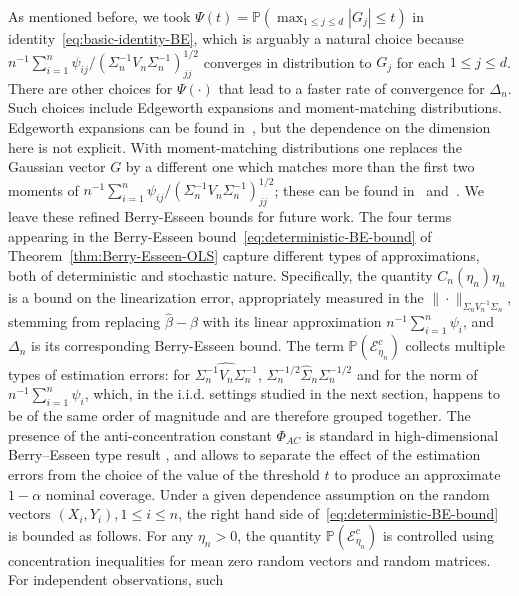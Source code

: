 \documentclass{article}
\begin{document}
As mentioned before, we took $\Psi(t) = \mathbb{P}(\max_{1\le j\le d}|G_j| \le t)$ in identity~\eqref{eq:basic-identity-BE}, which is arguably a natural choice because $n^{-1}\sum_{i=1}^n \psi_{ij}/(\Sigma_n^{-1}V_n\Sigma_n^{-1})_{jj}^{1/2}$ converges in distribution to $G_j$ for each $1\le j\le d$. There are other choices for $\Psi(\cdot)$ that lead to a faster rate of convergence for $\Delta_n$. Such choices include Edgeworth expansions and moment-matching distributions. Edgeworth expansions can be found in~\citet{bhattacharya2010normal}, but the dependence on the dimension here is not explicit. With moment-matching distributions one replaces the Gaussian vector $G$ by a different one which matches more than the first two moments of $n^{-1}\sum_{i=1}^n \psi_{ij}/(\Sigma_n^{-1}V_n\Sigma_n^{-1})_{jj}^{1/2}$; these can be found in~\cite{boutsikas2015penultimate} and~\cite{zhilova2016non}. We leave these refined Berry-Esseen bounds for future work.
The four terms appearing in the Berry-Esseen bound~\eqref{eq:deterministic-BE-bound} of Theorem~\ref{thm:Berry-Esseen-OLS} capture different types of approximations, both of deterministic and stochastic nature. Specifically, the quantity
$C_n(\eta_n)\eta_n$ is a bound on the linearization
error, appropriately measured in the $\| \cdot \|_{ \Sigma_n V^{-1}_n\Sigma_n }$, stemming from replacing $\widehat{\beta} - \beta$ with its
linear approximation $n^{-1}\sum_{i=1}^n \psi_i$, and
$\Delta_n$
is its corresponding Berry-Esseen bound. The term $\mathbb{P}(\mathcal{E}_{\eta_n}^c)$ collects multiple types of estimation errors: for $\widehat{\Sigma_n^{-1}V_n\Sigma_n^{-1}}$, $\Sigma_n^{-1/2}\widehat{\Sigma}_n\Sigma_n^{-1/2}$ and for the norm of $n^{-1} \sum_{i=1}^n \psi_i$, which, in the i.i.d. settings studied in the next section, happens to be of the same order of magnitude and are therefore grouped together. The presence of the anti-concentration constant $\Phi_{AC}$ is standard in high-dimensional Berry--Esseen type result \citep{chernozhukov2017detailed}, and allows to separate the effect of the estimation errors from the choice of the value of the threshold $t$ to produce an approximate $1-\alpha$ nominal coverage.
Under a given dependence assumption on the random vectors $(X_i, Y_i), 1\le i\le n$, the right hand side of~\eqref{eq:deterministic-BE-bound} is bounded as follows. For any $\eta_n > 0$, the quantity $\mathbb{P}(\mathcal{E}_{\eta_n}^c)$ is controlled using concentration inequalities for mean zero random vectors and random matrices. For independent observations, such
\end{document}
